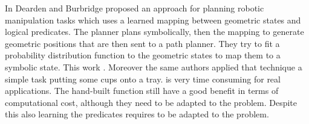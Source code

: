 In \citep{Dearden2014355} Dearden and Burbridge proposed an approach for planning robotic manipulation tasks which uses a learned mapping between geometric states and logical predicates.  The planner  plans symbolically, then  the mapping  to generate geometric positions that are then sent to a path planner. They try to fit a probability distribution function to the geometric states to map them to a symbolic state.  This work . Moreover the same authors applied that technique \citep{dearden2013approach}  a simple task  putting some cups  onto a tray.  is very time consuming for real applications. The hand-built function still have a good benefit in terms of computational cost, although they need to be adapted to the problem. Despite this also learning the predicates requires to be adapted to the problem. 


